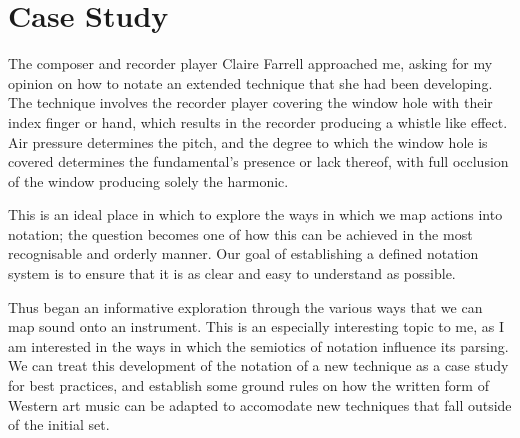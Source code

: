 \section{Case Study}

The composer and recorder player Claire Farrell approached me, asking for my opinion on how to notate an extended technique that she had been developing. 
The technique involves the recorder player covering the window hole with their index finger or hand, which results in the recorder producing a whistle like effect. 
Air pressure determines the pitch, and the degree to which the window hole is covered determines the fundamental's presence or lack thereof, with full occlusion of the window producing solely the harmonic. 

This is an ideal place in which to explore the ways in which we map actions into notation; the question becomes one of how this can be achieved in the most recognisable and orderly manner. 
Our goal of establishing a defined notation system is to ensure that it is as clear and easy to understand as possible. 

Thus began an informative exploration through the various ways that we can map sound onto an instrument. 
This is an especially interesting topic to me, as I am interested in the ways in which the semiotics of notation influence its parsing. 
We can treat this development of the notation of a new technique as a case study for best practices, and establish some ground rules on how the written form of Western art music can be adapted to accomodate new techniques that fall outside of the initial set.




